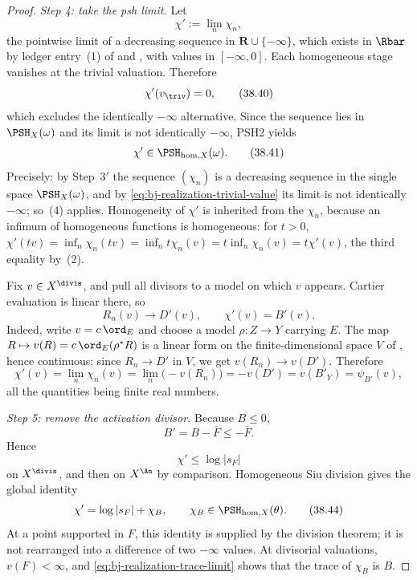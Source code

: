 \begin{proof}
\medskip
\noindent\emph{Step 4: take the psh limit.}
Let
\[
                              \chi':=\lim_n\chi_n,
\]
the pointwise limit of a decreasing sequence in
$\mathbf R\cup\{-\infty\}$, which exists in $\Rbar$ by ledger
entry~(1) of  and
, with values in
$[-\infty,0]$.
Each homogeneous stage vanishes at the trivial valuation.  Therefore
\[
                         \chi'(v_{\triv})=0,
\tag{38.40}\label{eq:bj-realization-trivial-value}
\]
which excludes the identically $-\infty$ alternative.  Since the sequence lies in $\PSH_X(\omega)$ and its limit
is not identically $-\infty$, PSH2 yields
\[
                         \chi'\in\PSH_{\mathrm{hom},X}(\omega).
\tag{38.41}\label{eq:bj-realization-limit}
\]
Precisely: by Step~3$'$ the sequence $(\chi_n)$ is a decreasing
sequence in the single space $\PSH_X(\omega)$, and by
\eqref{eq:bj-realization-trivial-value} its limit is not identically
$-\infty$; so \,(4) applies.  Homogeneity of
$\chi'$ is inherited from the $\chi_n$, because an infimum of
homogeneous functions is homogeneous: for $t>0$,
$\chi'(tv)=\inf_n\chi_n(tv)=\inf_nt\chi_n(v)=t\inf_n\chi_n(v)=t\chi'(v)$,
the third equality by \,(2).

Fix $v\in X^{\divis}$, and pull all divisors to a model on which $v$
appears.  Cartier evaluation is linear there, so
\[
 R_n(v)\longrightarrow D'(v),\qquad
 \chi'(v)=B'(v).
\tag{38.42}\label{eq:bj-realization-trace-limit}
\]
Indeed, write $v=c\,\ord_E$ and choose a model $\rho:Z\to Y$ carrying
$E$.  The map $R\mapsto v(R)=c\,\ord_E(\rho^*R)$ is a linear form on
the finite-dimensional space $V$ of
, hence continuous; since
$R_n\to D'$ in $V$, we get $v(R_n)\to v(D')$.  Therefore
\[
 \chi'(v)=\lim_n\chi_n(v)=\lim_n\bigl(-v(R_n)\bigr)=-v(D')=v(B'_Y)
 =\psi_{B'}(v),
\]
all the quantities being finite real numbers.

\medskip
\noindent\emph{Step 5: remove the activation divisor.}
Because $B\le0$,
\[
                    B'=B-\overline F\le-\overline F.
\]
Hence
\[
                         \chi'\le\log|s_F|
\tag{38.43}\label{eq:bj-realization-pole-bound}
\]
on $X^{\divis}$, and then on $X^{\An}$ by comparison.  Homogeneous
Siu division gives the global identity
\[
 \chi'=\log|s_F|+\chi_B,\qquad
 \chi_B\in\PSH_{\mathrm{hom},X}(\theta).
\tag{38.44}\label{eq:bj-realization-siu-division}
\]
At a point supported in $F$, this identity is supplied by the division
theorem; it is not rearranged into a difference of two $-\infty$ values.
At divisorial valuations, $v(F)<\infty$, and
\eqref{eq:bj-realization-trace-limit} shows that the trace of $\chi_B$
is $B$.


\end{proof}
